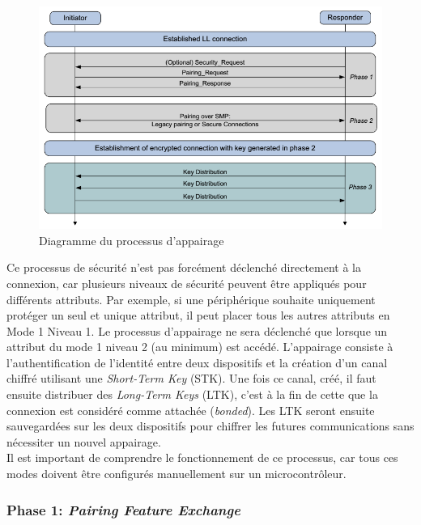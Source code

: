 \begin{figure}[ht!]
    \centering
    \includegraphics[width=1.0\textwidth]{Figures/Security/BLE/pairing-flowchart.png}
    \caption{Diagramme du processus d'appairage}
    \label{fig-pairing-flowchart}
\end{figure}

Ce processus de sécurité n'est pas forcément déclenché directement à la connexion, car plusieurs niveaux de sécurité peuvent être appliqués pour différents attributs. Par exemple, si une périphérique souhaite uniquement protéger un seul et unique attribut, il peut placer tous les autres attributs en Mode 1 Niveau 1. Le processus d'appairage ne sera déclenché que lorsque un attribut du mode 1 niveau 2 (au minimum) est accédé. L'appairage consiste à l'authentification de l'identité entre deux dispositifs et la création d'un canal chiffré utilisant une \textit{Short-Term Key} (STK). Une fois ce canal, créé, il faut ensuite distribuer des \textit{Long-Term Keys} (LTK), c'est à la fin de cette que la connexion est considéré comme attachée (\textit{bonded}). Les LTK seront ensuite sauvegardées sur les deux dispositifs pour chiffrer les futures communications sans nécessiter un nouvel appairage. \\

Il est important de comprendre le fonctionnement de ce processus, car tous ces modes doivent être configurés manuellement sur un microcontrôleur. 


\subsubsection{Phase 1: \textit{Pairing Feature Exchange}}

    
